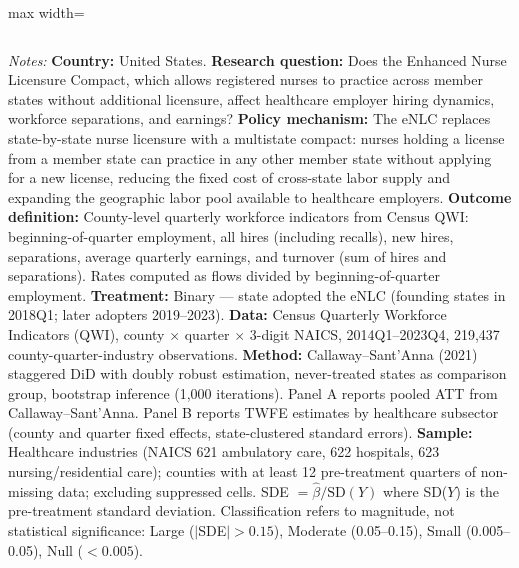 \begin{table}[H]
\begin{threeparttable}
\begin{adjustbox}{max width=\textwidth}
\begin{tabular}{lcccccc}
\bottomrule
\end{tabular}
\end{adjustbox}
\end{threeparttable}
\vspace{0.3em}
\parbox{\textwidth}{\footnotesize \textit{Notes:}
\textbf{Country:} United States. \textbf{Research question:} Does the Enhanced Nurse Licensure Compact, which allows registered nurses to practice across member states without additional licensure, affect healthcare employer hiring dynamics, workforce separations, and earnings? \textbf{Policy mechanism:} The eNLC replaces state-by-state nurse licensure with a multistate compact: nurses holding a license from a member state can practice in any other member state without applying for a new license, reducing the fixed cost of cross-state labor supply and expanding the geographic labor pool available to healthcare employers. \textbf{Outcome definition:} County-level quarterly workforce indicators from Census QWI: beginning-of-quarter employment, all hires (including recalls), new hires, separations, average quarterly earnings, and turnover (sum of hires and separations). Rates computed as flows divided by beginning-of-quarter employment. \textbf{Treatment:} Binary --- state adopted the eNLC (founding states in 2018Q1; later adopters 2019--2023). \textbf{Data:} Census Quarterly Workforce Indicators (QWI), county $\times$ quarter $\times$ 3-digit NAICS, 2014Q1--2023Q4, 219,437 county-quarter-industry observations. \textbf{Method:} Callaway--Sant'Anna (2021) staggered DiD with doubly robust estimation, never-treated states as comparison group, bootstrap inference (1,000 iterations). Panel A reports pooled ATT from Callaway--Sant'Anna. Panel B reports TWFE estimates by healthcare subsector (county and quarter fixed effects, state-clustered standard errors). \textbf{Sample:} Healthcare industries (NAICS 621 ambulatory care, 622 hospitals, 623 nursing/residential care); counties with at least 12 pre-treatment quarters of non-missing data; excluding suppressed cells. SDE $= \hat{\beta} / \text{SD}(Y)$ where SD($Y$) is the pre-treatment standard deviation. Classification refers to magnitude, not statistical significance: Large ($|$SDE$| > 0.15$), Moderate (0.05--0.15), Small (0.005--0.05), Null ($< 0.005$).}
\end{table}

